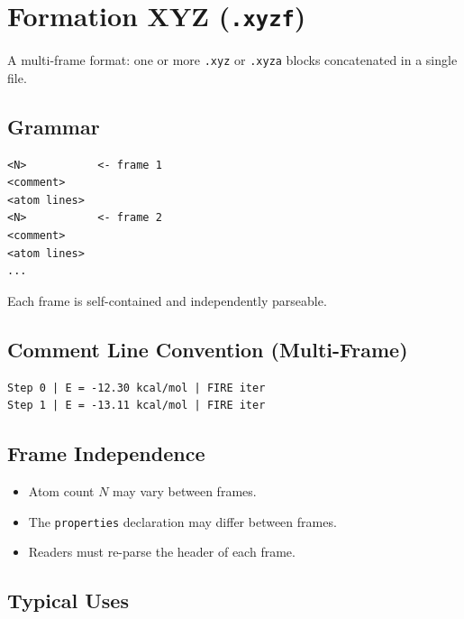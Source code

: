 \documentclass[12pt, a4paper, oneside]{article}
\begin{document}
\section{Formation XYZ (\texttt{.xyzf})}
\label{sec:xyzf}

A multi-frame format: one or more \texttt{.xyz} or \texttt{.xyza} blocks
concatenated in a single file.

\subsection{Grammar}

\begin{lstlisting}[language={},frame=single]
<N>           <- frame 1
<comment>
<atom lines>
<N>           <- frame 2
<comment>
<atom lines>
...
\end{lstlisting}

Each frame is self-contained and independently parseable.

\subsection{Comment Line Convention (Multi-Frame)}

\begin{lstlisting}[language={},frame=single]
Step 0 | E = -12.30 kcal/mol | FIRE iter
Step 1 | E = -13.11 kcal/mol | FIRE iter
\end{lstlisting}

\subsection{Frame Independence}

\begin{itemize}
  \item Atom count $N$ may vary between frames.
  \item The \texttt{properties} declaration may differ between frames.
  \item Readers must re-parse the header of each frame.
\end{itemize}

\subsection{Typical Uses}
\end{document}
